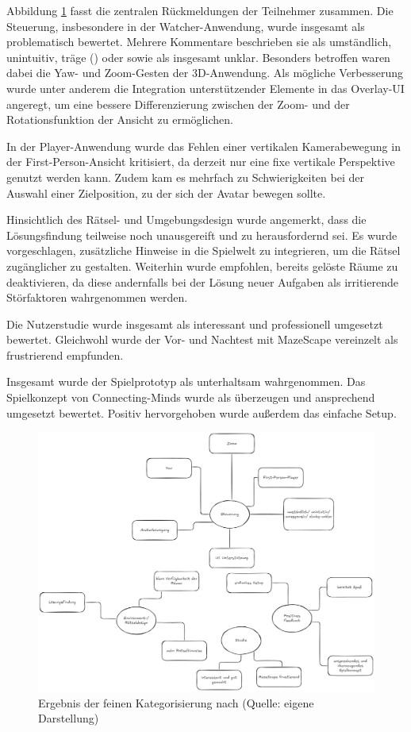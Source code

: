 Abbildung \ref{fig:qualitative-results-end} fasst die zentralen Rückmeldungen der Teilnehmer zusammen. Die Steuerung, insbesondere in der Watcher-Anwendung, wurde insgesamt als problematisch bewertet. Mehrere Kommentare beschrieben sie als umständlich, unintuitiv, träge () oder  sowie als insgesamt unklar. Besonders betroffen waren dabei die Yaw- und Zoom-Gesten der \ac{3D}-Anwendung. Als mögliche Verbesserung wurde unter anderem die Integration unterstützender Elemente in das Overlay-\ac{UI} angeregt, um eine bessere Differenzierung zwischen der Zoom- und der Rotationsfunktion der Ansicht zu ermöglichen.

In der Player-Anwendung wurde das Fehlen einer vertikalen Kamerabewegung in der First-Person-Ansicht kritisiert, da derzeit nur eine fixe vertikale Perspektive genutzt werden kann. Zudem kam es mehrfach zu Schwierigkeiten bei der Auswahl einer Zielposition, zu der sich der Avatar bewegen sollte.

Hinsichtlich des Rätsel- und Umgebungsdesign wurde angemerkt, dass die Lösungsfindung teilweise noch unausgereift und zu herausfordernd sei. Es wurde vorgeschlagen, zusätzliche Hinweise in die Spielwelt zu integrieren, um die Rätsel zugänglicher zu gestalten. Weiterhin wurde empfohlen, bereits gelöste Räume zu deaktivieren, da diese andernfalls bei der Lösung neuer Aufgaben als irritierende Störfaktoren wahrgenommen werden. 

Die Nutzerstudie wurde insgesamt als interessant und professionell umgesetzt bewertet. Gleichwohl wurde der Vor- und Nachtest mit MazeScape vereinzelt als frustrierend empfunden.

Insgesamt wurde der Spielprototyp als unterhaltsam wahrgenommen. Das Spielkonzept von Connecting-Minds wurde als überzeugen und ansprechend umgesetzt bewertet. Positiv hervorgehoben wurde außerdem das einfache Setup.

\begin{figure}[ht]
\centering
\includegraphics[width=1\linewidth]{content/pictures/Qualitative-Auswertung-Schritt-2.png}
\caption{Ergebnis der feinen Kategorisierung nach \cite{braun_using_2006} (Quelle: eigene Darstellung)}
\label{fig:qualitative-results-end}
\end{figure}

